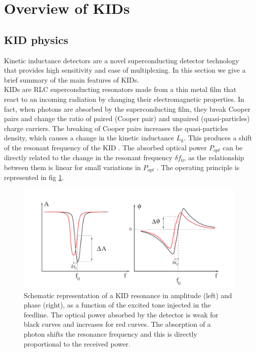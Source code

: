 \section{Overview of KIDs}
\label{sec2}
\subsection{KID physics}

Kinetic inductance detectors are a novel superconducting detector technology that provides high sensitivity and ease of multiplexing. In this section we give a brief summary of the main features of KIDs.\\
KIDs are RLC superconducting resonators made from a thin metal film that react to an incoming radiation by changing their electromagnetic properties. In fact, when photons are absorbed by the superconducting film, they break Cooper pairs and change the ratio of paired (Cooper pair) and unpaired (quasi-particles) charge carriers. The breaking of Cooper pairs increases the quasi-particles density, which causes a change in the kinetic inductance $L_{k}$. This produces a shift of the resonant frequency of the KID \citep{2013A&A...551L..12C}. The absorbed optical power $P_{opt}$ can be directly related to the change in the resonant frequency $\delta f_{0}$, as the relationship between them is linear for small variations in $P_{opt}$ \citep{2010ApPhL..96z3511S}. The operating principle is represented in fig \ref{resonance}.\\

\begin{figure}[h]
\center
	\includegraphics[scale=0.4]{Figures/resonance.png}
	\caption{Schematic representation of a KID resonance in amplitude (left) and phase (right), as a function of the excited tone injected in the feedline. The optical power absorbed by the detector is weak for black curves and increases for red curves. The absorption of a photon shifts the resonance frequency and this is directly proportional to the received power.}
	\label{resonance}
\end{figure}

